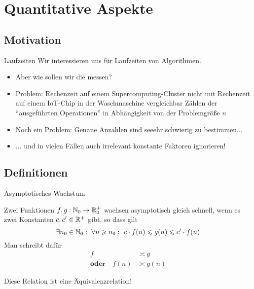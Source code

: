 \section{Quantitative Aspekte}


\subsection{Motivation}
\begin{frame}{Laufzeiten}
	Wir interessieren uns für Laufzeiten von Algorithmen.
	\pause
	\begin{itemize}
		\item Aber wie sollen wir die messen?
		\item Problem: Rechenzeit auf einem Supercomputing-Cluster nicht mit Rechenzeit auf einem IoT-Chip in der Waschmaschine vergleichbar
		\implitem Zählen der \enquote{ausgeführten Operationen} in Abhängigkeit von der Problemgröße $n$
		\item Noch ein Problem: Genaue Anzahlen sind seeehr schwierig zu bestimmen...
		\item[] ... und in vielen Fällen auch irrelevant
		\implitem konstante Faktoren ignorieren!
	\end{itemize}
\end{frame}


\subsection{Definitionen}
\begin{frame}{Asymptotisches Wachstum}
	\begin{Definition}
		Zwei Funktionen $f,g: \mathbb{N}_0 \to \mathbb{R}_0^+$ wachsen asymptotisch gleich schnell, wenn es zwei Konstanten $c, c' \in \mathbb{R}^+$ gibt, so dass gilt $$\exists n_0 \in \mathbb{N}_0: \ \forall n \geqslant n_0: \ c \cdot f(n) \leqslant g(n) \leqslant c' \cdot f(n) $$
		Man schreibt dafür 
		\begin{align*}
			f &\asymp g \\
			\textbf{oder} \quad f(n) &\asymp g(n) 
		\end{align*}
	\end{Definition} \pause
	Diese Relation ist eine Äquivalenzrelation!
\end{frame}

